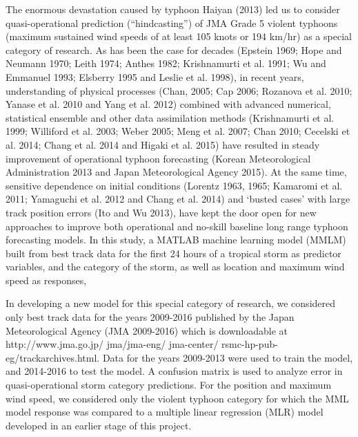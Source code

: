 \documentclass[a4paper, 12pt]{article}
\begin{document}
{The  enormous devastation caused by typhoon Haiyan (2013) led us to consider quasi-operational prediction (``hindcasting'') of JMA Grade 5 violent typhoons (maximum sustained wind speeds of at least 105 knots or 194 km/hr)  as a special category of research.   As has been the case for decades (Epstein 1969; Hope and Neumann 1970; Leith 1974; Anthes 1982;  Krishnamurti et al. 1991; Wu and Emmanuel 1993; Elsberry 1995 and Leslie et al. 1998),  in recent years, understanding of physical processes (Chan, 2005; Cap 2006; Rozanova et al. 2010; Yanase et al. 2010 and  Yang et al. 2012) combined with advanced numerical, statistical ensemble and other data assimilation methods  (Krishnamurti et al. 1999; Williford et al. 2003;  Weber 2005; Meng et al. 2007;  Chan 2010;  Cecelski et al. 2014; Chang et al. 2014 and Higaki et al. 2015) have resulted in steady improvement of operational typhoon forecasting  (Korean Meteorological Administration 2013 and Japan Meteorological Agency 2015).  At the same time, sensitive dependence on initial conditions (Lorentz 1963, 1965; Kamaromi et al. 2011; Yamaguchi et al. 2012 and Chang et al. 2014) and `busted cases'  with large track position errors (Ito and Wu 2013), have kept the door open for new approaches to improve both operational and no-skill baseline long range typhoon forecasting models. In this study, a MATLAB machine learning model (MMLM) built from best track data for the first 24 hours of a tropical storm as predictor variables, and the category of the storm, as well as location and maximum wind speed as responses,  


  In developing a new model for this special category of research, we considered only  best track data for the years 2009-2016  published by the Japan Meteorological Agency (JMA 2009-2016) which is downloadable at  http://www.jma.go.jp/ jma/jma-eng/ jma-center/ rsmc-hp-pub-eg/trackarchives.html. Data for the years 2009-2013 were used to train the model, and 2014-2016 to test the model. A confusion matrix is used to analyze error in quasi-operational storm category predictions.  For the position and maximum wind speed, we considered only the violent typhoon category for which the MML model response was compared to a multiple linear regression (MLR) model developed in an earlier stage of this project.
  
  
  

}
\end{document}
